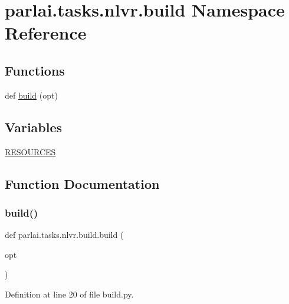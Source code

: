 \hypertarget{namespaceparlai_1_1tasks_1_1nlvr_1_1build}{}\section{parlai.\+tasks.\+nlvr.\+build Namespace Reference}
\label{namespaceparlai_1_1tasks_1_1nlvr_1_1build}
\subsection*{Functions}
\begin{DoxyCompactItemize}
\item 
def \hyperlink{namespaceparlai_1_1tasks_1_1nlvr_1_1build_a2b9db4e1ce7c18cbe126cdaf9ebc7e8a}{build} (opt)
\end{DoxyCompactItemize}
\subsection*{Variables}
\begin{DoxyCompactItemize}
\item 
\hyperlink{namespaceparlai_1_1tasks_1_1nlvr_1_1build_ae95d63757e7c78372c19c02ed683fe7e}{R\+E\+S\+O\+U\+R\+C\+ES}
\end{DoxyCompactItemize}


\subsection{Function Documentation}
\mbox{\label{namespaceparlai_1_1tasks_1_1nlvr_1_1build_a2b9db4e1ce7c18cbe126cdaf9ebc7e8a}} 
\subsubsection{\texorpdfstring{build()}{build()}}
{\footnotesize\ttfamily def parlai.\+tasks.\+nlvr.\+build.\+build (\begin{DoxyParamCaption}\item[{}]{opt }\end{DoxyParamCaption})}



Definition at line 20 of file build.\+py.


